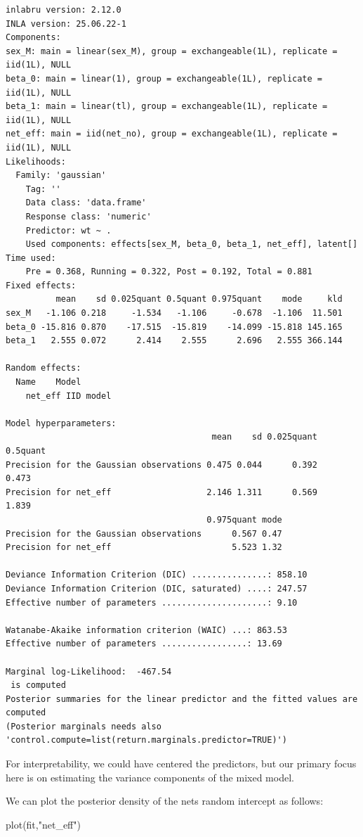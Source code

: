 \documentclass[
  letterpaper,
  DIV=11,
  numbers=noendperiod]{scrartcl}
\newenvironment{Shaded}{\begin{snugshade}}{\end{snugshade}}
\newcommand{\FunctionTok}[1]{\textcolor[rgb]{0.28,0.35,0.67}{#1}}
\newcommand{\NormalTok}[1]{\textcolor[rgb]{0.00,0.23,0.31}{#1}}
\newcommand{\StringTok}[1]{\textcolor[rgb]{0.13,0.47,0.30}{#1}}
\begin{document}
\begin{verbatim}
inlabru version: 2.12.0
INLA version: 25.06.22-1
Components:
sex_M: main = linear(sex_M), group = exchangeable(1L), replicate = iid(1L), NULL
beta_0: main = linear(1), group = exchangeable(1L), replicate = iid(1L), NULL
beta_1: main = linear(tl), group = exchangeable(1L), replicate = iid(1L), NULL
net_eff: main = iid(net_no), group = exchangeable(1L), replicate = iid(1L), NULL
Likelihoods:
  Family: 'gaussian'
    Tag: ''
    Data class: 'data.frame'
    Response class: 'numeric'
    Predictor: wt ~ .
    Used components: effects[sex_M, beta_0, beta_1, net_eff], latent[]
Time used:
    Pre = 0.368, Running = 0.322, Post = 0.192, Total = 0.881 
Fixed effects:
          mean    sd 0.025quant 0.5quant 0.975quant    mode     kld
sex_M   -1.106 0.218     -1.534   -1.106     -0.678  -1.106  11.501
beta_0 -15.816 0.870    -17.515  -15.819    -14.099 -15.818 145.165
beta_1   2.555 0.072      2.414    2.555      2.696   2.555 366.144

Random effects:
  Name    Model
    net_eff IID model

Model hyperparameters:
                                         mean    sd 0.025quant 0.5quant
Precision for the Gaussian observations 0.475 0.044      0.392    0.473
Precision for net_eff                   2.146 1.311      0.569    1.839
                                        0.975quant mode
Precision for the Gaussian observations      0.567 0.47
Precision for net_eff                        5.523 1.32

Deviance Information Criterion (DIC) ...............: 858.10
Deviance Information Criterion (DIC, saturated) ....: 247.57
Effective number of parameters .....................: 9.10

Watanabe-Akaike information criterion (WAIC) ...: 863.53
Effective number of parameters .................: 13.69

Marginal log-Likelihood:  -467.54 
 is computed 
Posterior summaries for the linear predictor and the fitted values are computed
(Posterior marginals needs also 'control.compute=list(return.marginals.predictor=TRUE)')
\end{verbatim}

For interpretability, we could have centered the predictors, but our
primary focus here is on estimating the variance components of the mixed
model.

We can plot the posterior density of the nets random intercept as
follows:

\begin{Shaded}
\begin{Highlighting}[]
\FunctionTok{plot}\NormalTok{(fit,}\StringTok{"net\_eff"}\NormalTok{)}
\end{Highlighting}
\end{Shaded}
\end{document}
